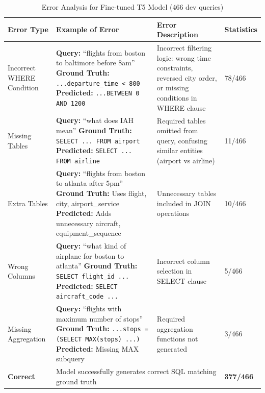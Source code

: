 \documentclass{article}
\begin{document}
\begin{table}[h!]
\centering
\small
\caption{Error Analysis for Fine-tuned T5 Model (466 dev queries)}
\label{tab:error_analysis_ft}
\begin{tabular}{p{2.5cm}p{5cm}p{3.5cm}p{1.5cm}}
\toprule
\textbf{Error Type} & \textbf{Example of Error} & \textbf{Error Description} & \textbf{Statistics} \\
\midrule

Incorrect WHERE Condition & 
\textbf{Query:} ``flights from boston to baltimore before 8am''
\newline
\textbf{Ground Truth:} \texttt{...departure\_time < 800}
\newline
\textbf{Predicted:} \texttt{...BETWEEN 0 AND 1200} &
Incorrect filtering logic: wrong time constraints, reversed city order, or missing conditions in WHERE clause &
78/466 \\

\midrule

Missing Tables & 
\textbf{Query:} ``what does IAH mean''
\newline
\textbf{Ground Truth:} \texttt{SELECT ... FROM airport}
\newline
\textbf{Predicted:} \texttt{SELECT ... FROM airline} &
Required tables omitted from query, confusing similar entities (airport vs airline) &
11/466 \\

\midrule

Extra Tables & 
\textbf{Query:} ``flights from boston to atlanta after 5pm''
\newline
\textbf{Ground Truth:} Uses flight, city, airport\_service
\newline
\textbf{Predicted:} Adds unnecessary aircraft, equipment\_sequence &
Unnecessary tables included in JOIN operations &
10/466 \\

\midrule

Wrong Columns & 
\textbf{Query:} ``what kind of airplane for boston to atlanta''
\newline
\textbf{Ground Truth:} \texttt{SELECT flight\_id ...}
\newline
\textbf{Predicted:} \texttt{SELECT aircraft\_code ...} &
Incorrect column selection in SELECT clause &
5/466 \\

\midrule

Missing Aggregation & 
\textbf{Query:} ``flights with maximum number of stops''
\newline
\textbf{Ground Truth:} \texttt{...stops = (SELECT MAX(stops) ...)}
\newline
\textbf{Predicted:} Missing MAX subquery &
Required aggregation functions not generated &
3/466 \\

\midrule
\textbf{Correct} & 
\multicolumn{2}{l}{Model successfully generates correct SQL matching ground truth} &
\textbf{377/466} \\

\bottomrule
\end{tabular}
\end{table}
\end{document}
